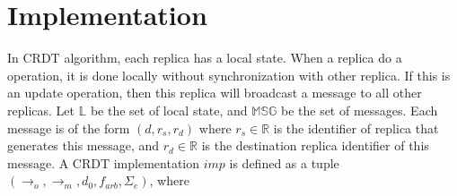 
\section{Implementation}
\label{sec:implementation}

{\color {red}In CRDT algorithm, each replica has a local state. When a replica do a operation, it is done locally without synchronization with other replica. If this is an update operation, then this replica will broadcast a message to all other replicas.} Let $\mathbb{L}$ be the set of local state, and $\mathbb{MSG}$ be the set of messages. Each message is of the form $(d,r_s,r_d)$ where $r_s \in \mathbb{R}$ is the identifier of replica that generates this message, and $r_d \in \mathbb{R}$ is the destination replica identifier of this message. A CRDT implementation $\mathit{imp}$ is defined as a tuple $(\rightarrow_o,\rightarrow_m,d_0,f_{\mathit{arb}}, \Sigma_e)$, where

